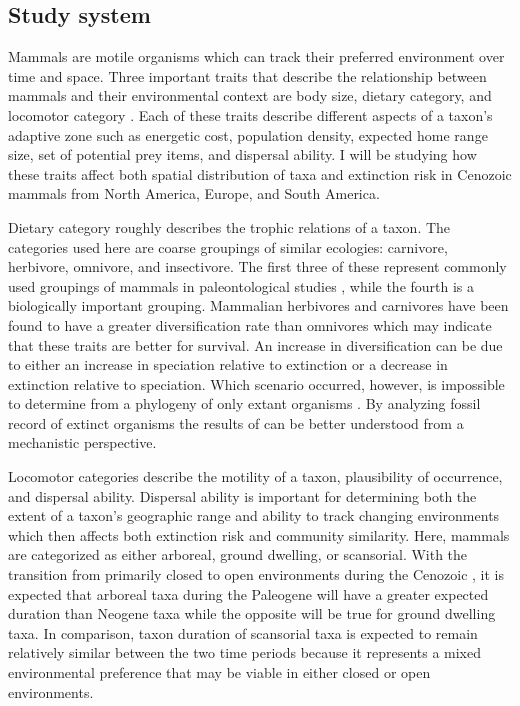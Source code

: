 \documentclass[11pt,letterpaper]{article}
\begin{document}
\subsection{Study system}
Mammals are motile organisms which can track their preferred environment over time and space. Three important traits that describe the relationship between mammals and their environmental context are body size, dietary category, and locomotor category \citep{Smith2004,Smith2008b,Damuth1981a,Damuth1979,Jernvall2004,Lyons2005,Lyons2010}. Each of these traits describe different aspects of a taxon's adaptive zone such as energetic cost, population density, expected home range size, set of potential prey items, and dispersal ability. I will be studying how these traits affect both spatial distribution of taxa and extinction risk in Cenozoic mammals from North America, Europe, and South America.

Dietary category roughly describes the trophic relations of a taxon. The categories used here are coarse groupings of similar ecologies: carnivore, herbivore, omnivore, and insectivore. The first three of these represent commonly used groupings of mammals in paleontological studies \citep{Jernvall2004,Price2012}, while the fourth is a biologically important grouping. Mammalian herbivores and carnivores have been found to have a greater diversification rate than omnivores \citep{Price2012} which may indicate that these traits are better for survival. An increase in diversification can be due to either an increase in speciation relative to extinction or a decrease in extinction relative to speciation. Which scenario occurred, however, is impossible to determine from a phylogeny of only extant organisms \citep{Rabosky2010a}. By analyzing fossil record of extinct organisms the results of \citet{Price2012} can be better understood from a mechanistic perspective.

Locomotor categories describe the motility of a taxon, plausibility of occurrence, and dispersal ability. Dispersal ability is important for determining both the extent of a taxon's geographic range and ability to track changing environments \citep{Birand2012,Jablonski2006a,Gaston2009} which then affects both extinction risk and community similarity. Here, mammals are categorized as either arboreal, ground dwelling, or scansorial. With the transition from primarily closed to open environments during the Cenozoic \citep{Blois2009,Janis1993a,Stromberg2005,Stromberg2013}, it is expected that arboreal taxa during the Paleogene will have a greater expected duration than Neogene taxa while the opposite will be true for ground dwelling taxa. In comparison, taxon duration of scansorial taxa is expected to remain relatively similar between the two time periods because it represents a mixed environmental preference that may be viable in either closed or open environments. 
\end{document}
